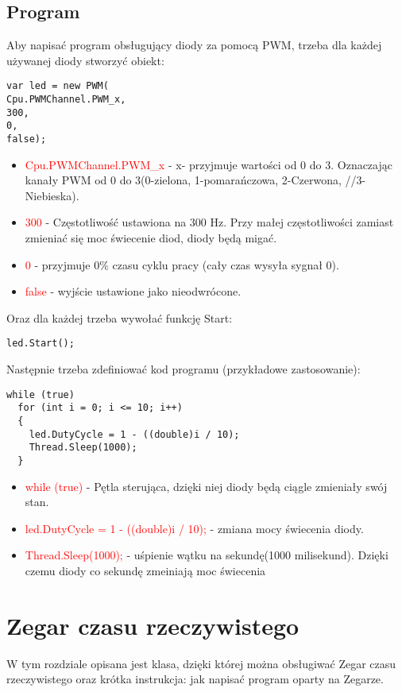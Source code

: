 \documentclass{article}
\begin{document}
\subsection{Program}
Aby napisać program obsługujący diody za pomocą PWM, trzeba dla każdej używanej diody stworzyć obiekt:
\begin{lstlisting}[frame=single]
var led = new PWM(
Cpu.PWMChannel.PWM_x,
300,
0,
false);
\end{lstlisting}
\begin{itemize}
\item \textcolor{red}{Cpu.PWMChannel.PWM\_x} - x- przyjmuje wartości od 0 do 3. Oznaczając kanały PWM od 0 do 3(0-zielona, 1-pomarańczowa, 2-Czerwona, //3-Niebieska).
\item \textcolor{red}{300} - Częstotliwość ustawiona na 300 Hz. Przy małej częstotliwości zamiast zmieniać się moc świecenie diod, diody będą migać.
\item \textcolor{red}{0} - przyjmuje 0\% czasu cyklu pracy (cały czas wysyła sygnał 0).
\item \textcolor{red}{false} - wyjście ustawione jako nieodwrócone.
\end{itemize}
Oraz dla każdej trzeba wywołać funkcję Start:
\begin{lstlisting}[frame=single]
led.Start();
\end{lstlisting}
Następnie trzeba zdefiniować kod programu (przykładowe zastosowanie):
\begin{lstlisting}[frame=single]
while (true)
  for (int i = 0; i <= 10; i++)
  {
    led.DutyCycle = 1 - ((double)i / 10);
    Thread.Sleep(1000);
  }
\end{lstlisting}
\begin{itemize}
\item \textcolor{red}{while (true)} - Pętla sterująca, dzięki niej diody będą ciągle zmieniały swój stan.
\item \textcolor{red}{led.DutyCycle = 1 - ((double)i / 10);} - zmiana mocy świecenia diody.
\item \textcolor{red}{Thread.Sleep(1000);} - uśpienie wątku na sekundę(1000 milisekund). Dzięki czemu diody co sekundę zmeiniają moc świecenia
\end{itemize}

\section{Zegar czasu rzeczywistego}
W tym rozdziale opisana jest klasa, dzięki której można obsługiwać Zegar czasu rzeczywistego oraz krótka instrukcja: jak napisać program oparty na Zegarze.
\end{document}
